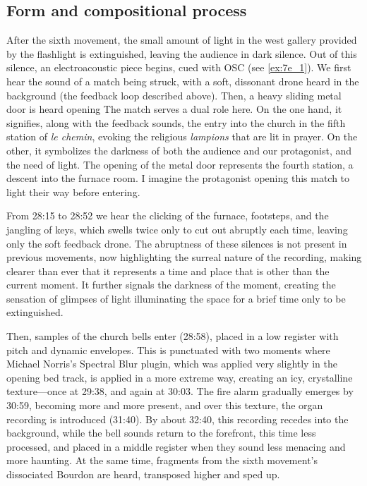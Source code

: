 \documentclass[12pt,twoside,maitrise]{dms_ks}
\theoremstyle{definition}
\begin{document}
{\subsection{Form and compositional process}

After the sixth movement, the small amount of light in the west gallery provided by the flashlight is extinguished, leaving the audience in dark silence. 
Out of this silence, an electroacoustic piece begins, cued with OSC (see \cref{ex:7e_1}). 
We first hear the sound of a match being struck, with a soft, dissonant drone heard in the background (the feedback loop described above). 
Then, a heavy sliding metal door is heard opening
The match serves a dual role here.
On the one hand, it signifies, along with the feedback sounds, the entry into the church in the fifth station of \textit{le chemin}, evoking the religious \textit{lampions} that are lit in prayer.
On the other, it symbolizes the darkness of both the audience and our protagonist, and the need of light.
The opening of the metal door represents the fourth station, a descent into the furnace room.
I imagine the protagonist opening this match to light their way before entering.

From 28:15 to 28:52 we hear the clicking of the furnace, footsteps, and the jangling of keys, which swells twice only to cut out abruptly each time, leaving only the soft feedback drone. 
The abruptness of these silences is not present in previous movements, now highlighting the surreal nature of the recording, making clearer than ever that it represents a time and place that is other than the current moment. 
It further signals the darkness of the moment, creating the sensation of glimpses of light illuminating the space for a brief time only to be extinguished. 

Then, samples of the church bells enter (28:58), placed in a low register with pitch and dynamic envelopes. 
This is punctuated with two moments where Michael Norris's Spectral Blur plugin, which was applied very slightly in the opening bed track, is applied in a more extreme way, creating an icy, crystalline texture---once at 29:38, and again at 30:03. 
The fire alarm gradually emerges by 30:59, becoming more and more present, and over this texture, the organ recording is introduced (31:40). 
By about 32:40, this recording recedes into the background, while the bell sounds return to the forefront, this time less processed, and placed in a middle register when they sound less menacing and more haunting. 
At the same time, fragments from the sixth movement's dissociated Bourdon are heard, transposed higher and sped up.

}
\end{document}
